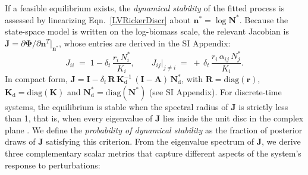 \documentclass[12pt]{article}
\begin{document}
If a feasible equilibrium exists, the \textit{dynamical stability} of the fitted process is assessed by linearizing Eqn.~\ref{LVRickerDiscr} about $\mathbf{n}^{*}=\log\mathbf{N}^{*}$. Because the state-space model is written on the log-biomass scale, the relevant Jacobian is $\mathbf{J}=\partial\boldsymbol{\Phi}/\partial\mathbf{n}^{T}\bigl|_{\mathbf{n}^{*}}$, whose entries are derived in the SI Appendix:
\begin{equation}\label{eqn:jacobian_entries_main}
	J_{ii} \;=\; 1 - \delta_{t}\,\frac{r_{i}\,N_{i}^{*}}{K_{i}}, \qquad J_{ij}\bigl|_{j\neq i} \;=\; +\,\delta_{t}\,\frac{r_{i}\,\alpha_{ij}\,N_{j}^{*}}{K_{i}}.
\end{equation}
In compact form, $\mathbf{J}=\mathbf{I}-\delta_{t}\,\mathbf{R}\,\mathbf{K}_{\mathrm{d}}^{-1}\,(\mathbf{I}-\mathbf{A})\,\mathbf{N}^{*}_{\mathrm{d}}$, with $\mathbf{R}=\mathrm{diag}(\mathbf{r})$, $\mathbf{K}_{\mathrm{d}}=\mathrm{diag}(\mathbf{K})$ and $\mathbf{N}^{*}_{\mathrm{d}}=\mathrm{diag}(\mathbf{N}^{*})$ (see SI Appendix). For discrete-time systems, the equilibrium is stable when the spectral radius of $\mathbf{J}$ is strictly less than 1, that is, when every eigenvalue of $\mathbf{J}$ lies inside the unit disc in the complex plane \citep{Elaydi2005}. We define the \textit{probability of dynamical stability} as the fraction of posterior draws of $\mathbf{J}$ satisfying this criterion. From the eigenvalue spectrum of $\mathbf{J}$, we derive three complementary scalar metrics that capture different aspects of the system's response to perturbations:
\end{document}
